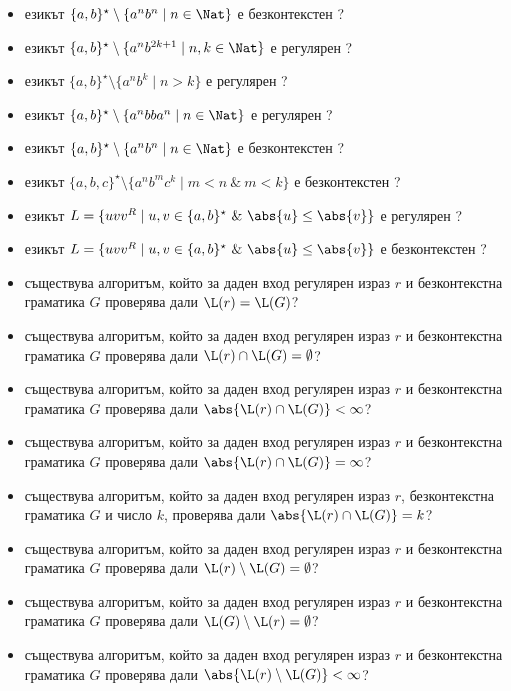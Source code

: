 \begin{itemize}
\item
  езикът $\{a,b\}^\star \setminus \{a^nb^n \mid n\in\Nat\}$ е безконтекстен ?
\item
  езикът $\{a,b\}^\star \setminus \{a^nb^{2k+1} \mid n,k\in\Nat\}$ е регулярен ?
\item
  езикът $\{a,b\}^\star \setminus \{a^nb^{k} \mid n > k\}$ е регулярен ?
\item
  езикът $\{a,b\}^\star \setminus \{a^nbba^{n} \mid n \in \Nat\}$ е регулярен ?
\item
  езикът $\{a,b\}^\star \setminus \{a^nb^n \mid n\in\Nat\}$ е безконтекстен ?
\item
  езикът $\{a,b,c\}^\star \setminus \{a^nb^mc^k \mid m < n\ \&\ m < k\}$ е безконтекстен ?
\item
  езикът $L = \{uvv^R \mid u,v \in \{a,b\}^\star\ \&\ \abs{u} \leq \abs{v}\}$ е регулярен ?
\item
  езикът $L = \{uvv^R \mid u,v \in \{a,b\}^\star\ \&\ \abs{u} \leq \abs{v}\}$ е безконтекстен ?
\item
  съществува алгоритъм, който за даден вход регулярен израз $r$ и безконтекстна граматика $G$
  проверява дали $\L(r) = \L(G)$?
\item
  съществува алгоритъм, който за даден вход регулярен израз $r$ и безконтекстна граматика $G$
  проверява дали $\L(r) \cap \L(G) = \emptyset$?
\item
  съществува алгоритъм, който за даден вход регулярен израз $r$ и безконтекстна граматика $G$
  проверява дали $\abs{\L(r) \cap \L(G)} < \infty$?
\item
  съществува алгоритъм, който за даден вход регулярен израз $r$ и безконтекстна граматика $G$
  проверява дали $\abs{\L(r) \cap \L(G)} = \infty$?
\item
  съществува алгоритъм, който за даден вход регулярен израз $r$, безконтекстна граматика $G$
  и число $k$, проверява дали $\abs{\L(r) \cap \L(G)} = k$?
\item
  съществува алгоритъм, който за даден вход регулярен израз $r$ и безконтекстна граматика $G$
  проверява дали $\L(r) \setminus \L(G) = \emptyset$?
\item
  съществува алгоритъм, който за даден вход регулярен израз $r$ и безконтекстна граматика $G$
  проверява дали $\L(G) \setminus \L(r) = \emptyset$?
\item
  съществува алгоритъм, който за даден вход регулярен израз $r$ и безконтекстна граматика $G$
  проверява дали $\abs{\L(r) \setminus \L(G)} < \infty$?

\end{itemize}
